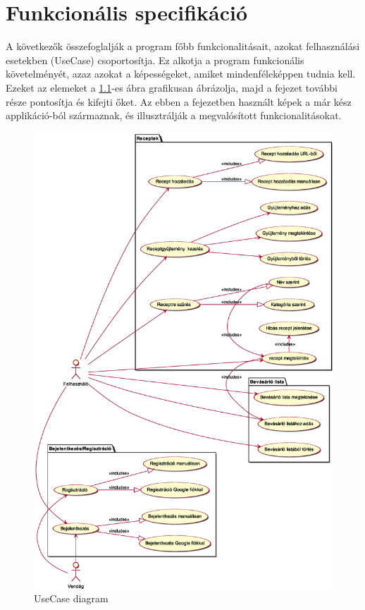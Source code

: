 \documentclass[12pt]{report}
\theoremstyle{definition}
\begin{document}
\chapter{Funkcionális specifikáció}
A következők összefoglalják a program főbb funkcionalitásait, azokat felhasználási esetekben (UseCase) csoportosítja. Ez alkotja a  program funkcionális követelményét, azaz azokat a képességeket, amiket mindenféleképpen tudnia kell. Ezeket az elemeket a \ref{fig:useCase}-es ábra grafikusan ábrázolja, majd a fejezet további része pontosítja és kifejti őket.
Az ebben a fejezetben használt képek a már kész applikáció-ból származnak, és illusztrálják a megvalósított funkcionalitásokat.

\noindent
\begin{figure}[h]
	\centering
	\includegraphics[width=\textwidth]{out/diagrams/useCase/use-case.eps}
	\caption{UseCase diagram}
    \label{fig:useCase}
\end{figure}
\end{document}
